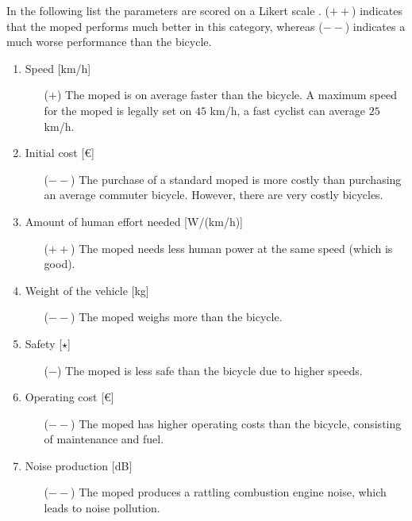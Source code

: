 \documentclass[a4paper]{article}
\begin{document}
In the following list the parameters are scored on a Likert scale \cite{likert}. ($++$) indicates that the moped performs much better in this category, whereas ($--$) indicates a much worse performance than the bicycle.

\begin{enumerate}
\item Speed [km/h]
    \begin{enumerate}
    \item[($+$)] The moped is on average faster than the bicycle. A maximum speed for the moped is legally set on $45$ km/h, a fast cyclist can average $25$ km/h.
    \end{enumerate}
\item Initial cost [€]
    \begin{enumerate}
    \item[($--$)] The purchase of a standard moped is more costly than purchasing an average commuter bicycle. However, there are very costly bicycles.
    \end{enumerate}
\item Amount of human effort needed [W/(km/h)]
    \begin{enumerate}
    \item[($++$)] The moped needs less human power at the same speed (which is good).
    \end{enumerate}
\item Weight of the vehicle [kg]
    \begin{enumerate}
    \item[($--$)] The moped weighs more than the bicycle.
    \end{enumerate}
\item Safety [$\star$]
    \begin{enumerate}
    \item[($-$)] The moped is less safe than the bicycle due to higher speeds.
    \end{enumerate}
\item Operating cost [€]
    \begin{enumerate}
    \item[($--$)] The moped has higher operating costs than the bicycle, consisting of maintenance and fuel.
    \end{enumerate}
\item Noise production [dB]
    \begin{enumerate}
    \item[($--$)] The moped produces a rattling combustion engine noise, which leads to noise pollution.
    \end{enumerate}
\end{enumerate}
\end{document}
